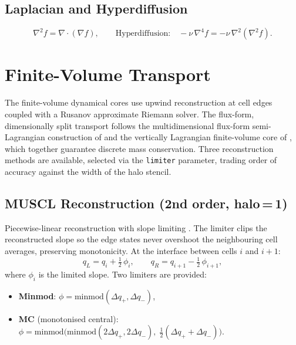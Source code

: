 \documentclass[11pt,a4paper]{article}
\newcommand{\half}{\tfrac{1}{2}}
\begin{document}
\subsection{Laplacian and Hyperdiffusion}
\begin{equation}
  \nabla^2 f = \nabla\!\cdot\!(\nabla f),
  \qquad \text{Hyperdiffusion:}\quad -\nu\,\nabla^4 f = -\nu\,\nabla^2(\nabla^2 f).
\end{equation}

\section{Finite-Volume Transport}

The finite-volume dynamical cores use upwind reconstruction at cell edges coupled with a Rusanov approximate Riemann solver.  The flux-form, dimensionally split transport follows the multidimensional flux-form semi-Lagrangian construction of \citet{LinRood1996} and the vertically Lagrangian finite-volume core of \citet{Lin2004}, which together guarantee discrete mass conservation.  Three reconstruction methods are available, selected via the \texttt{limiter} parameter, trading order of accuracy against the width of the halo stencil.

\subsection{MUSCL Reconstruction (2nd order, halo\,=\,1)}

Piecewise-linear reconstruction with slope limiting \citep{vanLeer1979}.  The limiter clips the reconstructed slope so the edge states never overshoot the neighbouring cell averages, preserving monotonicity.  At the interface between cells $i$ and $i\!+\!1$:
\begin{equation}
  q_L = q_i + \half\,\phi_i, \qquad q_R = q_{i+1} - \half\,\phi_{i+1},
\end{equation}
where $\phi_i$ is the limited slope.  Two limiters are provided:
\begin{itemize}[nosep]
  \item \textbf{Minmod}: $\phi=\mathrm{minmod}(\Delta q_{+},\Delta q_{-})$,
  \item \textbf{MC} (monotonised central): $\phi=\mathrm{minmod}\bigl(\mathrm{minmod}(2\Delta q_{+},2\Delta q_{-}),\;\half(\Delta q_{+}+\Delta q_{-})\bigr)$.
\end{itemize}
\end{document}
